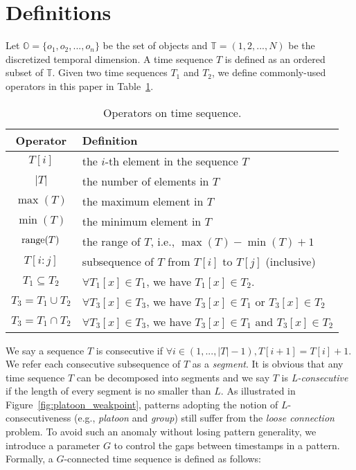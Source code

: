 \section{Definitions}
\label{sec:definition}
Let $\mathbb{O} = \{o_1 ,o_2,...,o_n\}$ be the set of objects and $\mathbb{T} =(1,2,...,N)$ be the discretized temporal dimension. A time sequence $T$ is defined as an ordered subset of $\mathbb{T}$. Given two time sequences $T_1$ and $T_2$, we define  commonly-used operators in this paper in Table~\ref{tbl:operators}.

\begin{table}[h] \scriptsize
\centering
\begin{tabular}{|c|l|}
\hline 
\textbf{Operator} & \textbf{Definition} \\ 
\hline
$T[i]$ & the $i$-th element in the sequence $T$ \\ 
\hline
$|T|$ & the number of elements in $T$\\
\hline
$\max(T)$ & the maximum element in $T$\\
\hline
$\min(T)$ & the minimum element in $T$\\
\hline
$\operatorname*{range}(T)$ & the range of $T$, i.e., $\max(T) - \min(T) +1$\\ 
\hline 
$T[i:j]$ & subsequence of $T$ from $T[i]$ to $T[j]$ (inclusive) \\ 
\hline
$T_1\subseteq T_2$ &  $\forall T_1[x]\in T_1$, we have $T_1[x]\in T_2$. \\\hline
$T_3=T_1\cup T_2$ & $\forall T_3[x]\in T_3$, we have $T_3[x]\in T_1$ or $T_3[x] \in T_2$\\ 
\hline
$T_3=T_1\cap T_2$ & $\forall T_3[x]\in T_3$, we have $T_3[x]\in T_1$ and $T_3[x] \in T_2$\\ 
\hline
\end{tabular}
\caption{Operators on time sequence.} \label{tbl:operators}
\end{table} 
 

We say a sequence $T$ is consecutive 
if $\forall i \in (1,...,|T|-1), T[i+1] = T[i] + 1$.  We refer each consecutive subsequence of $T$ as a \emph{segment}.
It is obvious that any time sequence $T$ can be decomposed into
segments and we say $T$ is \textit{L-consecutive}~\cite{li2015platoon} 
if the length of every segment is no smaller than $L$. As illustrated in Figure~\ref{fig:platoon_weakpoint}, patterns adopting the notion of $L$-consecutiveness (e.g., \emph{platoon} and \emph{group}) still suffer from the \emph{loose connection} problem. 
To avoid such an anomaly without losing pattern generality, we introduce a parameter $G$ to control the gaps between
timestamps in a pattern. Formally, a $G$-connected time sequence is defined as follows:

